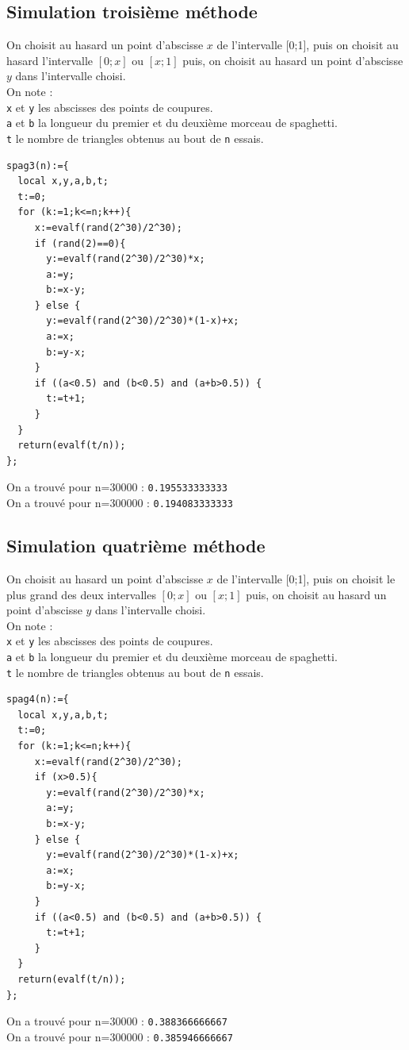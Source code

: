 \documentclass[a4paper,11pt]{book}
\begin{document}
\subsection{Simulation troisi\`eme m\'ethode}
On choisit au hasard un point d'abscisse $x$ de l'intervalle [0;1], puis
on choisit au hasard l'intervalle $[0;x]$ ou $[x;1]$ 
puis, on choisit au hasard un point d'abscisse $y$ dans l'intervalle choisi.\\
On note :\\
{\tt x} et {\tt y} les abscisses des points de coupures.\\
{\tt a} et {\tt b} la longueur du premier et du deuxi\`eme morceau 
de spaghetti.\\
{\tt t} le nombre de triangles obtenus au bout de {\tt n} essais.
\begin{verbatim}
spag3(n):={
  local x,y,a,b,t;
  t:=0;
  for (k:=1;k<=n;k++){
     x:=evalf(rand(2^30)/2^30);
     if (rand(2)==0){
       y:=evalf(rand(2^30)/2^30)*x;
       a:=y;
       b:=x-y;
     } else {
       y:=evalf(rand(2^30)/2^30)*(1-x)+x;
       a:=x;
       b:=y-x;
     }
     if ((a<0.5) and (b<0.5) and (a+b>0.5)) {
       t:=t+1;
     }
  }
  return(evalf(t/n));
}; 
\end{verbatim}
On a trouv\'e pour n=30000 :
{\tt 0.195533333333}\\
On a trouv\'e pour n=300000 :
{\tt 0.194083333333}
\subsection{Simulation quatri\`eme m\'ethode}
On choisit au hasard un point d'abscisse $x$ de l'intervalle [0;1], puis
on choisit le plus grand des deux intervalles $[0;x]$ ou $[x;1]$ 
puis, on choisit au hasard un point d'abscisse $y$ dans l'intervalle choisi.\\
On note :\\
{\tt x} et {\tt y} les abscisses des points de coupures.\\
{\tt a} et {\tt b} la longueur du premier et du deuxi\`eme morceau 
de spaghetti.\\
{\tt t} le nombre de triangles obtenus au bout de {\tt n} essais.
\begin{verbatim}
spag4(n):={
  local x,y,a,b,t;
  t:=0;
  for (k:=1;k<=n;k++){
     x:=evalf(rand(2^30)/2^30);
     if (x>0.5){
       y:=evalf(rand(2^30)/2^30)*x;
       a:=y;
       b:=x-y;
     } else {
       y:=evalf(rand(2^30)/2^30)*(1-x)+x;
       a:=x;
       b:=y-x;
     }
     if ((a<0.5) and (b<0.5) and (a+b>0.5)) {
       t:=t+1;
     }
  }
  return(evalf(t/n));
}; 
\end{verbatim}
On a trouv\'e pour n=30000 :
{\tt 0.388366666667}\\
On a trouv\'e pour n=300000 :
{\tt 0.385946666667}\\
\end{document}
